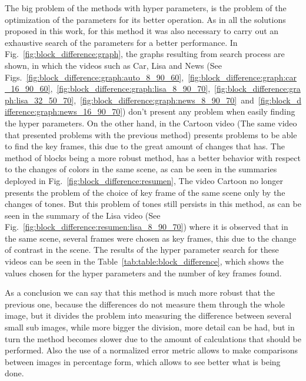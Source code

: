 \documentclass[journal]{IEEEtran}
\begin{document}
The big problem of the methods with hyper parameters, is the problem of the optimization of the parameters for its better operation. As in all the solutions proposed in this work, for this method it was also necessary to carry out an exhaustive search of the parameters for a better performance. In Fig.~\ref{fig:block_difference:graph}, the graphs resulting from search process are shown, in which the videos such as Car, Lisa and News (See Figs.~\ref{fig:block_difference:graph:auto_8_90_60},~\ref{fig:block_difference:graph:car_16_90_60},~\ref{fig:block_difference:graph:lisa_8_90_70},~\ref{fig:block_difference:graph:lisa_32_50_70},~\ref{fig:block_difference:graph:news_8_90_70}~and~\ref{fig:block_difference:graph:news_16_90_70}) don't present any problem when easily finding the hyper parameters. On the other hand, in the Cartoon video (The same video that presented problems with the previous method) presents problems to be able to find the key frames, this due to the great amount of changes that has. The method of blocks being a more robust method, has a better behavior with respect to the changes of colors in the same scene, as can be seen in the summaries deployed in Fig.~\ref{fig:block_difference:resumen}, The video Cartoon no longer presents the problem of the choice of key frame of the same scene only by the changes of tones. But this problem of tones still persists in this method, as can be seen in the summary of the Lisa video (See Fig.~\ref{fig:block_difference:resumen:lisa_8_90_70}) where it is observed that in the same scene, several frames were chosen as key frames, this due to the change of contrast in the scene. The results of the hyper parameter search for these videos can be seen in the Table~\ref{tab:table:block_difference}, which shows the values chosen for the hyper parameters and the number of key frames found.

As a conclusion we can say that this method is much more robust that the previous one, because the differences do not measure them through the whole image, but it divides the problem into measuring the difference between several small sub images, while more bigger the division, more detail can be had, but in turn the method becomes slower due to the amount of calculations that should be performed. Also the use of a normalized error metric allows to make comparisons between images in percentage form, which allows to see better what is being done.
\end{document}
